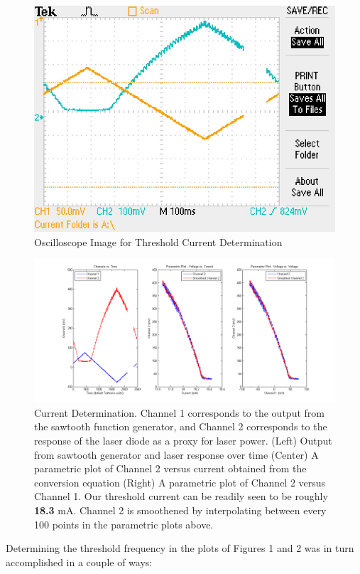 \documentclass[10pt,a4paper]{article}
\begin{document}
\begin{figure}[H]
\centering
\includegraphics[scale=0.3]{../Analysis/F0003TEK.JPG} 
\caption{Oscilloscope Image for Threshold Current Determination}
\end{figure}
\begin{figure}[H]
\centering
\includegraphics[scale=0.5]{../Analysis/ThresholdCurrentDetF0000.png} 
\caption{Current Determination. Channel 1 corresponds to the output from the sawtooth function generator, and Channel 2 corresponds to the response of the laser diode as a proxy for laser power. (Left) Output from sawtooth generator and laser response over time (Center) A parametric plot of Channel 2 versus current obtained from the conversion equation (Right) A parametric plot of Channel 2 versus Channel 1. Our threshold current can be readily seen to be roughly \textbf{18.3} mA. Channel 2 is smoothened by interpolating between every 100 points in the parametric plots above.}
\end{figure}
\noindent Determining the threshold frequency in the plots of Figures 1 and 2 was in turn accomplished in a couple of ways:
\end{document}

